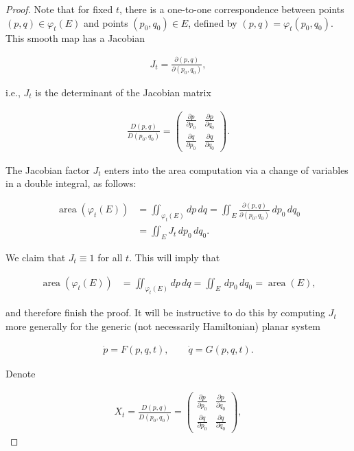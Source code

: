 \documentclass[11pt]{report}
\theoremstyle{plain}
\theoremstyle{definition}
\begin{document}
\begin{proof}
Note that for fixed $t$, there is a one-to-one
correspondence between points $(p,q) \in \varphi_t(E)$
and points $(p_0,q_0)\in E$, defined by
$(p,q)=\varphi_t(p_0,q_0)$. This smooth map has a
Jacobian

\begin{align*}
J_t = \frac{\partial (p,q)}{\partial (p_0,q_0)},
\end{align*}

i.e., $J_t$ is the determinant of the Jacobian matrix

\begin{align*}
\frac{D(p,q)}{D(p_0,q_0)} = \left(\begin{array}{cc}
\frac{\partial p}{\partial p_0} & \frac{\partial p}{\partial q_0} \\ \frac{\partial q}{\partial p_0} & \frac{\partial q}{\partial q_0}
\end{array}\right).
\end{align*}

The Jacobian factor $J_t$ enters into the area
computation via a change of variables in a double
integral, as follows:

\begin{align*}
\operatorname{area}(\varphi_t(E)) &= \iint_{\varphi_t(E)} dp\,dq
= \iint_E \frac{\partial (p,q)}{\partial (p_0,q_0)}\,dp_0\,dq_0 \\
&= \iint_E J_t \,dp_0\,dq_0.
\end{align*}

We claim that $J_t\equiv 1$ for all $t$. This will
imply that

\begin{align*}
\operatorname{area}(\varphi_t(E)) &= \iint_{\varphi_t(E)} dp\,dq
= \iint_E \,dp_0\,dq_0 = \operatorname{area}(E),
\end{align*}

and therefore finish the proof. It will be
instructive to do this by computing $J_t$ more
generally for the generic (not necessarily
Hamiltonian) planar system

\begin{align*}
\dot{p} = F(p,q,t), \qquad
\dot{q} = G(p,q,t).
\end{align*}

Denote

\begin{align*}
X_t = \frac{D(p,q)}{D(p_0,q_0)} = \left(\begin{array}{cc}
\frac{\partial p}{\partial p_0} & \frac{\partial p}{\partial q_0} \\ \frac{\partial q}{\partial p_0} & \frac{\partial q}{\partial q_0}
\end{array}\right),
\end{align*}


\end{proof}
\end{document}
